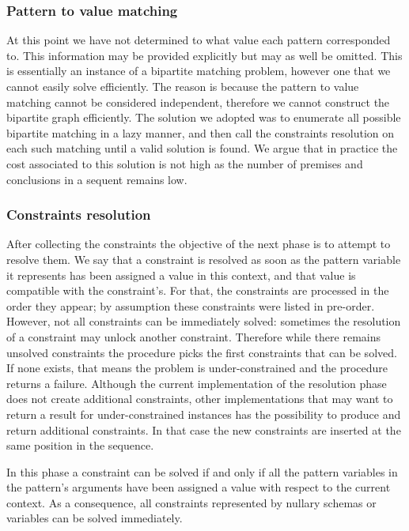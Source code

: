 \subsubsection{Pattern to value matching}

At this point we have not determined to what value each pattern corresponded to. This information may be provided explicitly but may as well be omitted. This is essentially an instance of a bipartite matching problem, however one that we cannot easily solve efficiently. The reason is because the pattern to value matching cannot be considered independent, therefore we cannot construct the bipartite graph efficiently. The solution we adopted was to enumerate all possible bipartite matching in a lazy manner, and then call the constraints resolution on each such matching until a valid solution is found. We argue that in practice the cost associated to this solution is not high as the number of premises and conclusions in a sequent remains low.

\subsubsection{Constraints resolution}

After collecting the constraints the objective of the next phase is to attempt to resolve them. We say that a constraint is resolved as soon as the pattern variable it represents has been assigned a value in this context, and that value is compatible with the constraint's. For that, the constraints are processed in the order they appear; by assumption these constraints were listed in pre-order. However, not all constraints can be immediately solved: sometimes the resolution of a constraint may unlock another constraint. Therefore while there remains unsolved constraints the procedure picks the first constraints that can be solved. If none exists, that means the problem is under-constrained and the procedure returns a failure. Although the current implementation of the resolution phase does not create additional constraints, other implementations that may want to return a result for under-constrained instances has the possibility to produce and return additional constraints. In that case the new constraints are inserted at the same position in the sequence.

In this phase a constraint can be solved if and only if all the pattern variables in the pattern's arguments have been assigned a value with respect to the current context. As a consequence, all constraints represented by nullary schemas or variables can be solved immediately.

